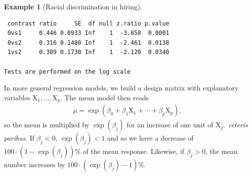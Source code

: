 \documentclass[
  11pt,
  letterpaper,
]{scrbook}
\theoremstyle{definition}
\newtheorem{example}{Example}[chapter]
\theoremstyle{definition}
\theoremstyle{remark}
\begin{document}
\begin{example}[Racial discrimination in
hiring]
\begin{verbatim}
 contrast ratio     SE  df null z.ratio p.value
 0vs1     0.446 0.0933 Inf    1  -3.858  0.0001
 0vs2     0.316 0.1480 Inf    1  -2.461  0.0138
 1vs2     0.389 0.1730 Inf    1  -2.120  0.0340

Tests are performed on the log scale 
\end{verbatim}

\end{example}

In more general regression models, we build a design matrix with
explanatory variables \(\mathrm{X}_1, \ldots, \mathrm{X}_p\). The mean
model then reads \begin{align*}
\mu = \exp(\beta_0 + \beta_1 \mathrm{X}_{1} + \cdots + \beta_p \mathrm{X}_{p}),
\end{align*} so the mean is multiplied by \(\exp(\beta_j)\) for an
increase of one unit of \(\mathrm{X}_{j},\) \emph{ceteris paribus.} If
\(\beta_j < 0\), \(\exp(\beta_j) < 1\) and so we have a decrease of
\(100\cdot(1-\exp(\beta_j))\)\% of the mean response. Likewise, if
\(\beta_j>0\), the mean number increases by
\(100\cdot(\exp(\beta_j)-1)\)\%.
\end{document}
